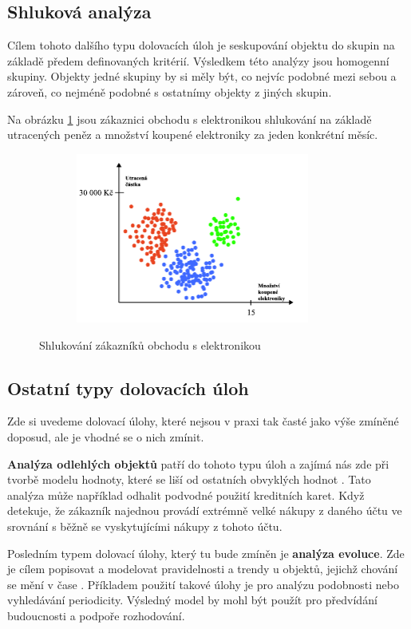 \subsection*{Shluková analýza}
Cílem tohoto dalšího typu dolovacích úloh je seskupování objektu do skupin na základě předem definovaných kritérií. Výsledkem této analýzy jsou homogenní skupiny. Objekty jedné skupiny by si měly být, co nejvíc podobné mezi sebou a zároveň, co nejméně podobné s ostatnímy objekty z jiných skupin. \cite{Mesakar}

Na obrázku \ref{cluster} jsou zákaznici  obchodu s elektronikou shlukování na základě utracených peněz a množství koupené elektroniky za jeden konkrétní měsíc.

\begin{figure}[h]\centering
  \centering
  \includegraphics[width=4.0in,height=2.2in]{obrazky/slukovani_pr.pdf}\\[1pt]
  \caption{Shlukování zákazníků obchodu s elektronikou}
  \label{cluster}
\end{figure}

\subsection*{Ostatní typy dolovacích úloh}
Zde si uvedeme dolovací úlohy, které nejsou v praxi tak časté jako výše zmíněné doposud, ale je vhodné se o nich zmínit.

\textbf{Analýza odlehlých objektů} patří do tohoto typu úloh a zajímá nás zde při tvorbě modelu hodnoty, které se liší od ostatních obvyklých hodnot \cite{Han}. Tato analýza může například odhalit podvodné použití kreditních karet. Když detekuje, že zákazník najednou provádí extrémně velké nákupy z daného účtu ve srovnání s běžně se vyskytujícími nákupy z tohoto účtu. 

Posledním typem dolovací úlohy, který tu bude zmíněn je \textbf{analýza evoluce}. Zde je cílem popisovat a modelovat pravidelnosti a trendy u objektů, jejichž chování se mění v čase \cite{Dunham}. Příkladem použití takové úlohy je pro analýzu podobnosti nebo vyhledávání periodicity. Výsledný model by mohl být použít pro předvídání budoucnosti a podpoře rozhodování.

